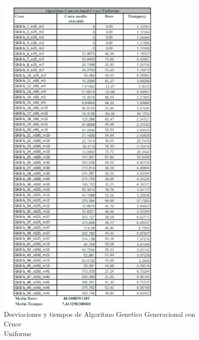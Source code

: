 \documentclass{article}
\begin{document}
\begin{figure}[h]
  \centering
  \includegraphics[width=0.75\textwidth]{capturastablas/AGG-Uniforme.png}
  \caption{Desviaciones y tiempos de Algoritmo Genetico Generacional con Cruce \\
  Uniforme}
\end{figure}
\end{document}
